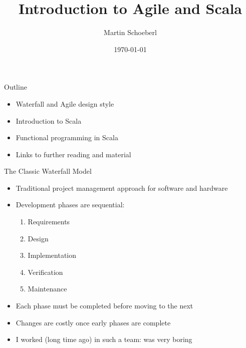 

\newif\ifbook


\usepackage{tikz}
\usetikzlibrary{positioning, arrows.meta}


\title{Introduction to Agile and Scala}
\author{Martin Schoeberl}
\date{\today}



\begin{frame}
\titlepage
\end{frame}


\begin{frame}[fragile]{Outline}
\begin{itemize}
\item Waterfall and Agile design style
\item Introduction to Scala
\item Functional programming in Scala
\item Links to further reading and material
\end{itemize}
\end{frame}


\begin{frame}{The Classic Waterfall Model}
\begin{itemize}
    \item Traditional project management approach for software and hardware
    \item Development phases are sequential:
    \begin{enumerate}
        \item Requirements
        \item Design
        \item Implementation
        \item Verification
        \item Maintenance
    \end{enumerate}
    \item Each phase must be completed before moving to the next
    \item Changes are costly once early phases are complete
    \item I worked (long time ago) in such a team: was very boring
\end{itemize}
\end{frame}

